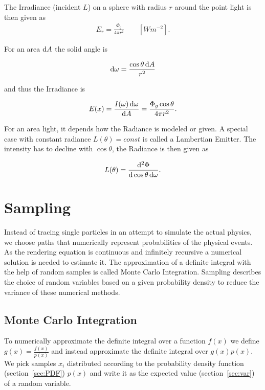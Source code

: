The Irradiance (incident $L$) on a sphere with radius $r$ around the point light is then given as
\begin{align}
E_r =  \frac{\Phi_g}{4\pi r^2} \qquad [ W m^{-2} ] .
\end{align}

For an area $\mathop{}\!\mathrm{d} A$ the solid angle is 

\begin{align}
\mathop{}\!\mathrm{d} \omega = \frac{\cos \theta \mathop{}\!\mathrm{d} A}{r^2}  
\end{align}


and thus the Irradiance is

\begin{align}
E(x) = \frac{ I(\omega) \mathop{}\!\mathrm{d} \omega }{ \mathop{}\!\mathrm{d} A } = \frac{ \Phi_g \cos \theta }{ 4 \pi r^2}.
\end{align}

For an area light, it depends how the Radiance is modeled or given. A special case with constant radiance $L(\theta) = const$ is called a Lambertian Emitter. The intensity has to decline with $\cos\theta$, the Radiance is then given as 

\begin{align}
L(\theta) = \frac{\mathop{}\!\mathrm{d}^2\Phi}{\mathop{}\!\mathrm{d}\cos\theta\mathop{}\!\mathrm{d}\omega}.
\end{align}



\section{Sampling}

Instead of tracing single particles in an attempt to simulate the actual physics, we choose paths that numerically represent probabilities of the physical events.  As the rendering equation is continuous and infinitely recursive a numerical solution is needed to estimate it. The approximation of a definite integral with the help of random samples is called Monte Carlo Integration. Sampling describes the choice of random variables based on a given probability density to reduce the variance of these numerical methods.

\subsection{Monte Carlo Integration}
\label{sec:montecarlo}
\label{sec:MC}

To numerically approximate the definite integral over a function $f(x)$ we define $g(x) = \frac{f(x)}{p(x)}$ and instead approximate the definite integral over $g(x)p(x)$. We pick samples $x_i$ distributed according to the probability density function (section~\ref{sec:PDF}) $p(x)$ and write it as the expected value (section~\ref{sec:var}) of a random variable.

